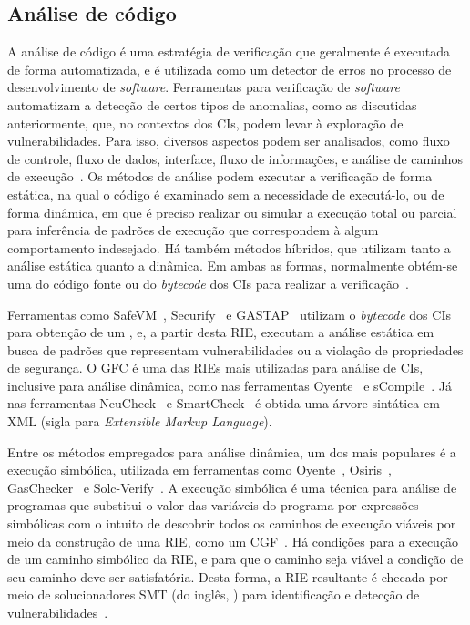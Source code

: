 \subsection{Análise de código} \label{tex:fund:analise-codigo}

A análise de código é uma estratégia de verificação que geralmente é executada de forma automatizada, e é utilizada como um detector de erros no processo de desenvolvimento de \textit{software}. Ferramentas para verificação de \textit{software} automatizam a detecção de certos tipos de anomalias, como as discutidas anteriormente, que, no contextos dos CIs, podem levar à exploração de vulnerabilidades. Para isso, diversos aspectos podem ser analisados, como fluxo de controle, fluxo de dados, interface, fluxo de informações, e análise de caminhos de execução~\cite{luu2016making-oyente-56, zheng2006value-analysis}. Os métodos de análise podem executar a verificação de forma estática, na qual o código é examinado sem a necessidade de executá-lo, ou de forma dinâmica, em que é preciso realizar ou simular a execução total ou parcial para inferência de padrões de execução que correspondem à algum comportamento indesejado. Há também métodos híbridos, que utilizam tanto a análise estática quanto a dinâmica. Em ambas as formas, normalmente obtém-se uma  do código fonte ou do \textit{bytecode} dos CIs para realizar a verificação~\cite{luu2016making-oyente-56, tsankov2018securify-76, tikhomirov2018smartcheck-85}. 

Ferramentas como SafeVM~\cite{albert2019safevm-73}, Securify~\cite{tsankov2018securify-76} e GASTAP~\cite{albert2021don-29} utilizam o \textit{bytecode} dos CIs para obtenção de um , e, a partir desta RIE, executam a análise estática em busca de padrões que representam vulnerabilidades ou a violação de propriedades de segurança. O GFC é uma das RIEs mais utilizadas para análise de CIs, inclusive para análise dinâmica, como nas ferramentas Oyente~\cite{luu2016making-oyente-56} e sCompile~\cite{chang2019scompile-74}. Já nas ferramentas NeuCheck~\cite{lu2019neucheck-63} e SmartCheck~\cite{tikhomirov2018smartcheck-85} é obtida uma árvore sintática em XML (sigla para \textit{Extensible Markup Language}). 

Entre os métodos empregados para análise dinâmica, um dos mais populares é a execução simbólica, utilizada em ferramentas como Oyente~\cite{luu2016making-oyente-56}, Osiris~\cite{torres2018osiris-65}, GasChecker~\cite{chen2020gaschecker-50} e Solc-Verify~\cite{hajdu2019solc-89}. A execução simbólica é uma técnica para análise de programas que substitui o valor das variáveis do programa por expressões simbólicas com o intuito de descobrir todos os caminhos de execução viáveis por meio da construção de uma RIE, como um CGF~\cite{king1976symbolic}. Há condições para a execução de um caminho simbólico da RIE, e para que o caminho seja viável a condição de seu caminho deve ser satisfatória. Desta forma, a RIE resultante é checada por meio de solucionadores SMT (do inglês, ) para identificação e detecção de vulnerabilidades~\cite{almakhour2020verification-survey}.

